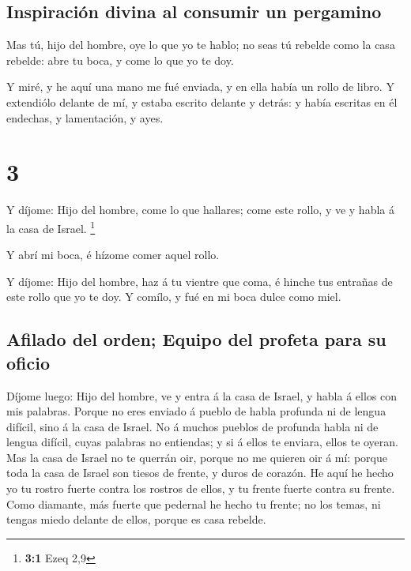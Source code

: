 \hypertarget{inspiraciuxf3n-divina-al-consumir-un-pergamino}{%
\subsection{Inspiración divina al consumir un
pergamino}\label{inspiraciuxf3n-divina-al-consumir-un-pergamino}}

 Mas tú, hijo del hombre, oye lo que yo te hablo; no seas tú
rebelde como la casa rebelde: abre tu boca, y come lo que yo te doy.

 Y miré, y he aquí una mano me fué enviada, y en ella había
un rollo de libro.  Y extendiólo delante de mí, y estaba
escrito delante y detrás: y había escritas en él endechas, y
lamentación, y ayes.

\hypertarget{section-2}{%
\section{3}\label{section-2}}

 Y díjome: Hijo del hombre, come lo que hallares; come este
rollo, y ve y habla á la casa de Israel. \footnote{\textbf{3:1} Ezeq 2,9}

 Y abrí mi boca, é hízome comer aquel rollo.

 Y díjome: Hijo del hombre, haz á tu vientre que coma, é
hinche tus entrañas de este rollo que yo te doy. Y comílo, y fué en mi
boca dulce como miel.

\hypertarget{afilado-del-orden-equipo-del-profeta-para-su-oficio}{%
\subsection{Afilado del orden; Equipo del profeta para su
oficio}\label{afilado-del-orden-equipo-del-profeta-para-su-oficio}}

 Díjome luego: Hijo del hombre, ve y entra á la casa de
Israel, y habla á ellos con mis palabras.  Porque no eres
enviado á pueblo de habla profunda ni de lengua difícil, sino á la casa
de Israel.  No á muchos pueblos de profunda habla ni de
lengua difícil, cuyas palabras no entiendas; y si á ellos te enviara,
ellos te oyeran.  Mas la casa de Israel no te querrán oir,
porque no me quieren oir á mí: porque toda la casa de Israel son tiesos
de frente, y duros de corazón.  He aquí he hecho yo tu
rostro fuerte contra los rostros de ellos, y tu frente fuerte contra su
frente.  Como diamante, más fuerte que pedernal he hecho tu
frente; no los temas, ni tengas miedo delante de ellos, porque es casa
rebelde.

